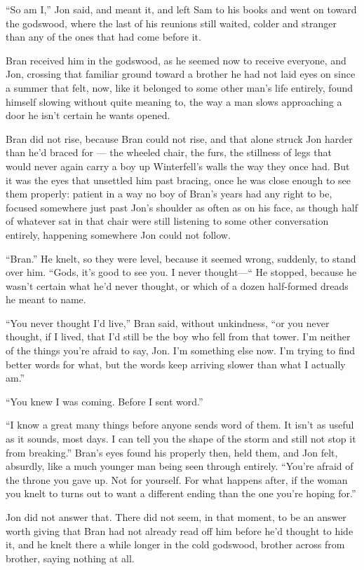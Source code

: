 “So am I,” Jon said, and meant it, and left Sam to his books and went on toward the godswood, where the last of his reunions still waited, colder and stranger than any of the ones that had come before it.

\sceneBreak

Bran received him in the godswood, as he seemed now to receive everyone, and Jon, crossing that familiar ground toward a brother he had not laid eyes on since a summer that felt, now, like it belonged to some other man’s life entirely, found himself slowing without quite meaning to, the way a man slows approaching a door he isn’t certain he wants opened.

Bran did not rise, because Bran could not rise, and that alone struck Jon harder than he’d braced for — the wheeled chair, the furs, the stillness of legs that would never again carry a boy up Winterfell’s walls the way they once had. But it was the eyes that unsettled him past bracing, once he was close enough to see them properly: patient in a way no boy of Bran’s years had any right to be, focused somewhere just past Jon’s shoulder as often as on his face, as though half of whatever sat in that chair were still listening to some other conversation entirely, happening somewhere Jon could not follow.

“Bran.” He knelt, so they were level, because it seemed wrong, suddenly, to stand over him. “Gods, it’s good to see you. I never thought—“ He stopped, because he wasn’t certain what he’d never thought, or which of a dozen half-formed dreads he meant to name.

“You never thought I’d live,” Bran said, without unkindness, “or you never thought, if I lived, that I’d still be the boy who fell from that tower. I’m neither of the things you’re afraid to say, Jon. I’m something else now. I’m trying to find better words for what, but the words keep arriving slower than what I actually am.”

“You knew I was coming. Before I sent word.”

“I know a great many things before anyone sends word of them. It isn’t as useful as it sounds, most days. I can tell you the shape of the storm and still not stop it from breaking.” Bran’s eyes found his properly then, held them, and Jon felt, absurdly, like a much younger man being seen through entirely. “You’re afraid of the throne you gave up. Not for yourself. For what happens after, if the woman you knelt to turns out to want a different ending than the one you’re hoping for.”

Jon did not answer that. There did not seem, in that moment, to be an answer worth giving that Bran had not already read off him before he’d thought to hide it, and he knelt there a while longer in the cold godswood, brother across from brother, saying nothing at all.